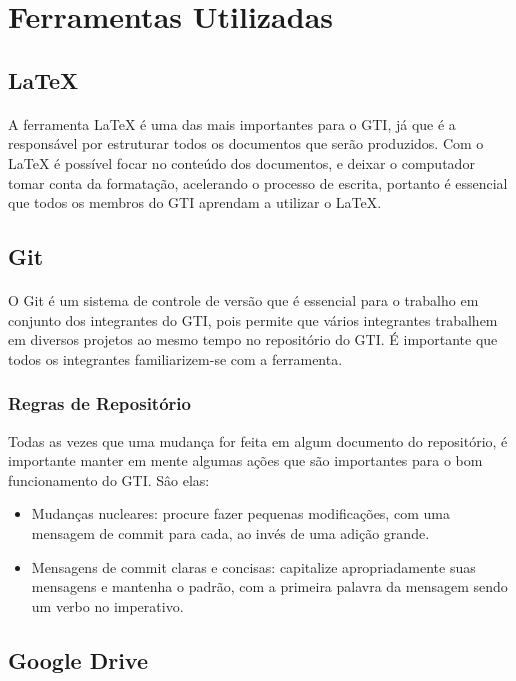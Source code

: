 \documentclass{article}
\begin{document}
\section{Ferramentas Utilizadas}
\subsection{LaTeX}
\paragraph{}
A ferramenta LaTeX é uma das mais importantes para o GTI, já que é a responsável por estruturar todos os documentos que serão produzidos. Com o LaTeX é possível focar no conteúdo dos documentos, e deixar o computador tomar conta da formatação, acelerando o processo de escrita, portanto é essencial que todos os membros do GTI aprendam a utilizar o LaTeX.

\subsection{Git}
\paragraph{}
O Git é um sistema de controle de versão que é essencial para o trabalho em conjunto dos integrantes do GTI, pois permite que vários integrantes trabalhem em diversos projetos ao mesmo tempo no repositório do GTI. É importante que todos os integrantes familiarizem-se com a ferramenta.
\subsubsection{Regras de Repositório}
Todas as vezes que uma mudança for feita em algum documento do repositório, é importante manter em mente algumas ações que são importantes para o bom funcionamento do GTI. Sâo elas:
\begin{itemize}
\item Mudanças nucleares: procure fazer pequenas modificações, com uma mensagem de commit para cada, ao invés de uma adição grande.
\item Mensagens de commit claras e concisas: capitalize apropriadamente suas mensagens e mantenha o padrão, com a primeira palavra da mensagem sendo um verbo no imperativo.
\end{itemize}

\subsection{Google Drive}
\end{document}
